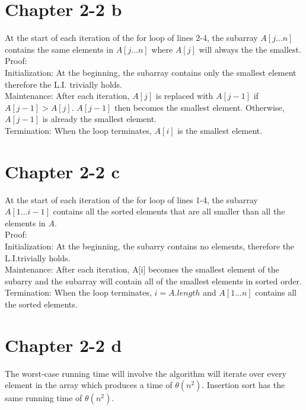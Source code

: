 \documentclass[12pt]{article}
\begin{document}
\section{Chapter 2-2 b}

At the start of each iteration of the for loop of lines 2-4, the subarray $A[j...n]$ contains the same elements in $A[j...n]$ where $A[j]$ will always the the smallest. \\

Proof: \\

Initialization: At the beginning, the subarray contains only the smallest element therefore the L.I. trivially holds. \\

Maintenance: After each iteration, $A[j]$ is replaced with $A[j-1]$ if $A[j-1] > A[j]$. $A[j-1]$ then becomes the smallest element. Otherwise, $A[j-1]$ is already the smallest element. \\

Termination: When the loop terminates, $A[i]$ is the smallest element. \\

\section{Chapter 2-2 c}

At the start of each iteration of the for loop of lines 1-4, the subarray $A[1...i-1]$ contains all the sorted elements that are all smaller than all the elements in $A$. \\

Proof: \\

Initialization: At the beginning, the subarry contains no elements, therefore the L.I.trivially  holds. \\

Maintenance: After each iteration, A[i] becomes the smallest element of the subarry and the subarray will contain all of the smallest elements in sorted order. \\

Termination: When the loop terminates, $i=A.length$ and $A[1...n]$ contains all the sorted elements.\\

\section{Chapter 2-2 d}

The worst-case running time will involve the algorithm will iterate over every element in the array which produces a time of $\theta(n^2)$. Insertion sort has the same running time of $\theta(n^2)$.

    
\end{document}
